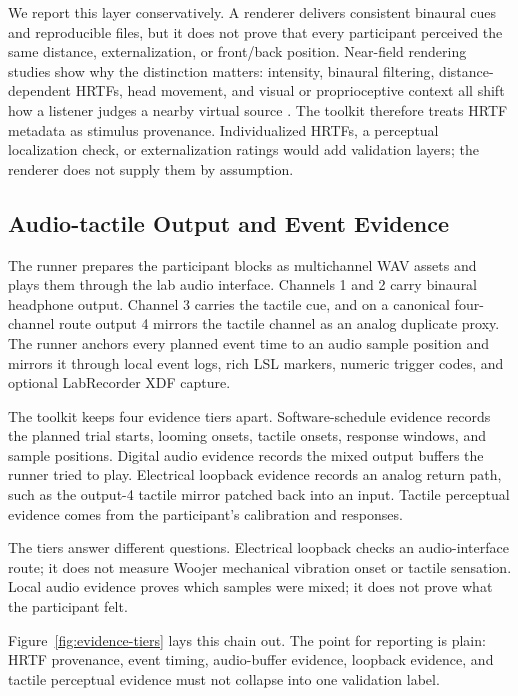 \documentclass[pdflatex,sn-apa]{sn-jnl}
\begin{document}
We report this layer conservatively. A renderer delivers consistent binaural cues and reproducible files, but it does not prove that every participant perceived the same distance, externalization, or front/back position. Near-field rendering studies show why the distinction matters: intensity, binaural filtering, distance-dependent HRTFs, head movement, and visual or proprioceptive context all shift how a listener judges a nearby virtual source \citep{Parseihian2014,Kan2009,Spagnol2017,Arend2021}. The toolkit therefore treats HRTF metadata as stimulus provenance. Individualized HRTFs, a perceptual localization check, or externalization ratings would add validation layers; the renderer does not supply them by assumption.

\subsection{Audio-tactile Output and Event Evidence}

The runner prepares the participant blocks as multichannel WAV assets and plays them through the lab audio interface. Channels 1 and 2 carry binaural headphone output. Channel 3 carries the tactile cue, and on a canonical four-channel route output 4 mirrors the tactile channel as an analog duplicate proxy. The runner anchors every planned event time to an audio sample position and mirrors it through local event logs, rich LSL markers, numeric trigger codes, and optional LabRecorder XDF capture.

The toolkit keeps four evidence tiers apart. Software-schedule evidence records the planned trial starts, looming onsets, tactile onsets, response windows, and sample positions. Digital audio evidence records the mixed output buffers the runner tried to play. Electrical loopback evidence records an analog return path, such as the output-4 tactile mirror patched back into an input. Tactile perceptual evidence comes from the participant's calibration and responses.

The tiers answer different questions. Electrical loopback checks an audio-interface route; it does not measure Woojer mechanical vibration onset or tactile sensation. Local audio evidence proves which samples were mixed; it does not prove what the participant felt.

Figure~\ref{fig:evidence-tiers} lays this chain out. The point for reporting is plain: HRTF provenance, event timing, audio-buffer evidence, loopback evidence, and tactile perceptual evidence must not collapse into one validation label.
\end{document}
